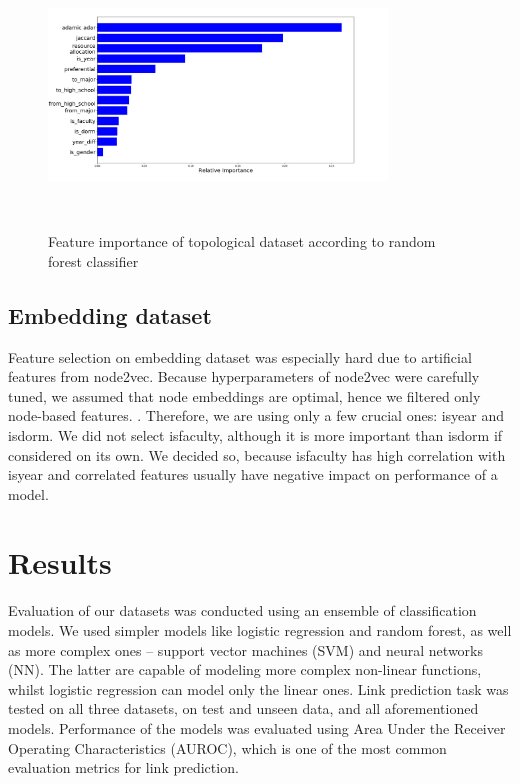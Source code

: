 \documentclass[9pt,twocolumn,twoside]{pnas-new}
\begin{document}
\begin{figure}
\centering
\includegraphics[width=9cm, height=7cm]{topological_feature_importance.png}
\caption{Feature importance of topological dataset according to random forest classifier}
\label{fig:topological_feature_importance}
\end{figure}








\subsection*{Embedding dataset}

Feature selection on embedding dataset was especially hard due to artificial features from node2vec. Because hyperparameters of node2vec were carefully tuned, we assumed that node embeddings are optimal, hence we filtered only node-based features.  \cite{Attributed}. Therefore, we are using only a few crucial ones: is\textunderscore year and is\textunderscore dorm. We did not select is\textunderscore faculty, although it is more important than is\textunderscore dorm if considered on its own. We decided so, because is\textunderscore faculty has high correlation with is\textunderscore year and correlated features usually have negative impact on performance of a model. 











\section*{Results}

Evaluation of our datasets was conducted using an ensemble of classification models. We used simpler models like logistic regression and random forest, as well as more complex ones -- support vector machines (SVM) and neural networks (NN). The latter are capable of modeling more complex non-linear functions, whilst logistic regression can model only the linear ones. Link prediction task was tested on all three datasets, on test and unseen data, and all aforementioned models. Performance of the models was evaluated using Area Under the Receiver Operating Characteristics (AUROC), which is one of the most common evaluation metrics for link prediction. 
\end{document}
